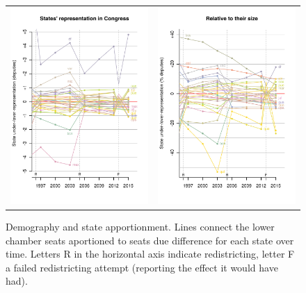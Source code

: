 \documentclass[letter,12pt]{article}
\begin{document}
\begin{figure}
\begin{center}
  \begin{tabular}{cc}
    \includegraphics[width=.5\columnwidth]{../graphs/statesUnderOverRep.pdf} & 
    \includegraphics[width=.5\columnwidth]{../graphs/statesUnderOverRep-rel.pdf} \\ 
  \end{tabular}
  \caption{Demography and state apportionment. Lines connect the lower chamber seats aportioned to seats due difference for each state over time. Letters R in the horizontal axis indicate redistricting, letter F a failed redistricting attempt (reporting the effect it would have had).}\label{F:underOverRep}
\end{center}
\end{figure}
\end{document}
